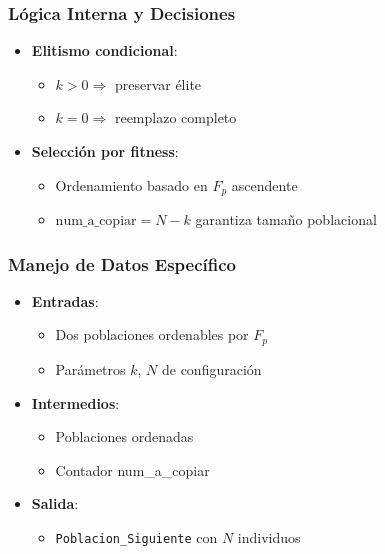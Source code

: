 \subsubsection{Lógica Interna y Decisiones}
\begin{itemize}
    \item \textbf{Elitismo condicional}:
    \begin{itemize}
        \item $k > 0 \Rightarrow$ preservar élite
        \item $k = 0 \Rightarrow$ reemplazo completo
    \end{itemize}

    \item \textbf{Selección por fitness}:
    \begin{itemize}
        \item Ordenamiento basado en $F_p$ ascendente
        \item $\text{num\_a\_copiar} = N - k$ garantiza tamaño poblacional
    \end{itemize}
\end{itemize}

\subsubsection{Manejo de Datos Específico}
\begin{itemize}
    \item \textbf{Entradas}:
    \begin{itemize}
        \item Dos poblaciones ordenables por $F_p$
        \item Parámetros $k$, $N$ de configuración
    \end{itemize}

    \item \textbf{Intermedios}:
    \begin{itemize}
        \item Poblaciones ordenadas
        \item Contador num\_a\_copiar
    \end{itemize}

    \item \textbf{Salida}:
    \begin{itemize}
        \item \texttt{Poblacion\_Siguiente} con $N$ individuos
    \end{itemize}
\end{itemize}

